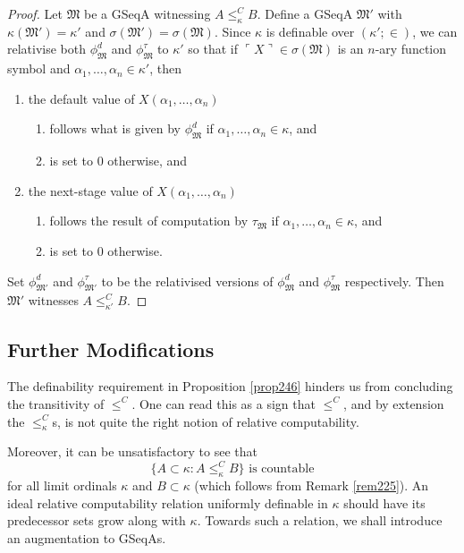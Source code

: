 \documentclass[12pt, twoside]{memoir}
\numberwithin{equation}{section}
\theoremstyle{definition}
\theoremstyle{remark}
\theoremstyle{definition}
\theoremstyle{definition}
\theoremstyle{definition}
\theoremstyle{remark}
\begin{document}
\begin{proof}
Let $\mathfrak{M}$ be a GSeqA witnessing $A \leq^C_{\kappa} B$. Define a GSeqA $\mathfrak{M}'$ with $\kappa(\mathfrak{M}') = \kappa'$ and $\sigma(\mathfrak{M}') = \sigma(\mathfrak{M})$. Since $\kappa$ is definable over $(\kappa'; \in)$, we can relativise both $\phi^d_{\mathfrak{M}}$ and $\phi^{\tau}_{\mathfrak{M}}$ to $\kappa'$ so that if $\ulcorner X \urcorner \in \sigma(\mathfrak{M})$ is an $n$-ary function symbol and $\alpha_1, \dots, \alpha_n \in \kappa'$, then 
\begin{enumerate}[label=(\arabic*)]
    \item the default value of $X(\alpha_1, \dots, \alpha_n)$
    \begin{enumerate}[label=(\alph*)]
        \item follows what is given by $\phi^d_{\mathfrak{M}}$ if $\alpha_1, \dots, \alpha_n \in \kappa$, and
        \item is set to $0$ otherwise, and
    \end{enumerate}
    \item the next-stage value of $X(\alpha_1, \dots, \alpha_n)$
    \begin{enumerate}[label=(\alph*)]
        \item follows the result of computation by $\tau_{\mathfrak{M}}$ if $\alpha_1, \dots, \alpha_n \in \kappa$, and
        \item is set to $0$ otherwise.
    \end{enumerate}
\end{enumerate} 
Set $\phi^d_{\mathfrak{M}'}$ and $\phi^{\tau}_{\mathfrak{M}'}$ to be the relativised versions of $\phi^d_{\mathfrak{M}}$ and $\phi^{\tau}_{\mathfrak{M}}$ respectively. Then $\mathfrak{M}'$ witnesses $A \leq^C_{\kappa'} B$.
\end{proof}

\subsection{Further Modifications}\label{ss320}

The definability requirement in Proposition \ref{prop246} hinders us from concluding the transitivity of $\leq^C$. One can read this as a sign that $\leq^C$, and by extension the $\leq^C_{\kappa}$s, is not quite the right notion of relative computability.

Moreover, it can be unsatisfactory to see that
\begin{equation*}
    \{A \subset \kappa : A \leq^C_{\kappa} B\} \text{ is countable}
\end{equation*}
for all limit ordinals $\kappa$ and $B \subset \kappa$ (which follows from Remark \ref{rem225}). An ideal relative computability relation uniformly definable in $\kappa$ should have its predecessor sets grow along with $\kappa$. Towards such a relation, we shall introduce an augmentation to GSeqAs.
\end{document}
